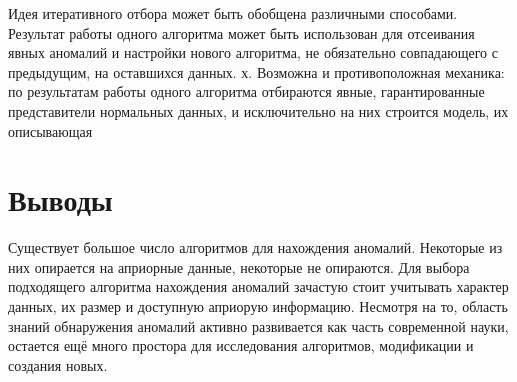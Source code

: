Идея итеративного отбора может быть обобщена различными способами. Результат работы одного алгоритма может быть использован для отсеивания явных аномалий и настройки нового алгоритма, не обязательно совпадающего с предыдущим, на оставшихся данных. х. Возможна и противоположная механика: по результатам работы одного алгоритма отбираются явные, гарантированные
представители нормальных данных, и исключительно на них строится модель,
их описывающая
\section{Выводы}
Существует большое число алгоритмов для нахождения аномалий. Некоторые из них опирается на априорные данные, некоторые не опираются. Для выбора подходящего алгоритма нахождения аномалий зачастую стоит учитывать характер данных, их размер и доступную априорую информацию. Несмотря на то, область знаний обнаружения аномалий активно развивается как часть современной науки, остается ещё много простора для исследования алгоритмов, модификации и создания новых.




